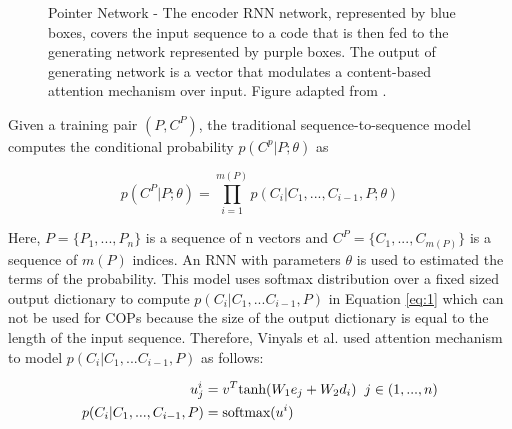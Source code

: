 \documentclass{article}
\begin{document}
\begin{figure}
    \caption{Pointer Network - The encoder RNN network, represented by blue boxes, covers the input sequence to a code that is then fed to the generating network represented by purple boxes. The output of generating network is a vector that modulates a content-based attention mechanism over input. Figure adapted from \cite{vinyals2015pointer}.}
    \label{fig:ptr-net}
\end{figure}

Given a training pair $(P, C^P)$, the traditional sequence-to-sequence model computes the conditional probability $p(C^p|P;\theta)$ as

\begin{equation}
    p(C^P|P;\theta) = \prod_{i=1}^{m(P)} p(C_i|C_1,...,C_{i-1}, P;\theta)
    \label{eq:1}
\end{equation}

Here, $P = \{P_1,..., P_n\}$ is a sequence of n vectors and $C^P = \{C_1,..., C_{m(P)}\}$ is a sequence of $m(P)$ indices. An RNN with parameters $\theta$ is used to estimated the terms of the probability. This model uses softmax distribution over a fixed sized output dictionary to compute $p(C_i|C_1,...C_{i-1},P)$ in Equation \ref{eq:1} which can not be used for COPs because the size of the output dictionary is equal to the length of the input sequence. Therefore, Vinyals et al. used attention mechanism to model $p(C_i|C_1,...C_{i-1},P)$ as follows:

\begin{align*}
    u^i_j &= v^T \text{tanh}(W_1e_j + W_2d_i) \hspace{0.2cm} j \in (1,...,n) \\
    p(C_i|C_1,...,C_{i-1},P) &= \text{softmax}(u^i)
    \label{eq:2}
\end{align*}
\end{document}

